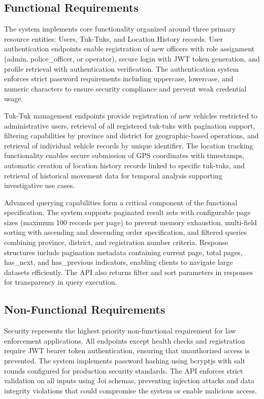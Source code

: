 \documentclass[12pt,a4paper]{article}
\begin{document}
\subsection{Functional Requirements}

The system implements core functionality organized around three primary resource entities: Users, Tuk-Tuks, and Location History records. User authentication endpoints enable registration of new officers with role assignment (admin, police\_officer, or operator), secure login with JWT token generation, and profile retrieval with authentication verification. The authentication system enforces strict password requirements including uppercase, lowercase, and numeric characters to ensure security compliance and prevent weak credential usage.

Tuk-Tuk management endpoints provide registration of new vehicles restricted to administrative users, retrieval of all registered tuk-tuks with pagination support, filtering capabilities by province and district for geographic-based operations, and retrieval of individual vehicle records by unique identifier. The location tracking functionality enables secure submission of GPS coordinates with timestamps, automatic creation of location history records linked to specific tuk-tuks, and retrieval of historical movement data for temporal analysis supporting investigative use cases.

Advanced querying capabilities form a critical component of the functional specification. The system supports paginated result sets with configurable page sizes (maximum 100 records per page) to prevent memory exhaustion, multi-field sorting with ascending and descending order specification, and filtered queries combining province, district, and registration number criteria. Response structures include pagination metadata containing current page, total pages, has\_next, and has\_previous indicators, enabling clients to navigate large datasets efficiently. The API also returns filter and sort parameters in responses for transparency in query execution.

\subsection{Non-Functional Requirements}

Security represents the highest priority non-functional requirement for law enforcement applications. All endpoints except health checks and registration require JWT bearer token authentication, ensuring that unauthorized access is prevented. The system implements password hashing using bcryptjs with salt rounds configured for production security standards. The API enforces strict validation on all inputs using Joi schemas, preventing injection attacks and data integrity violations that could compromise the system or enable malicious access.
\end{document}
